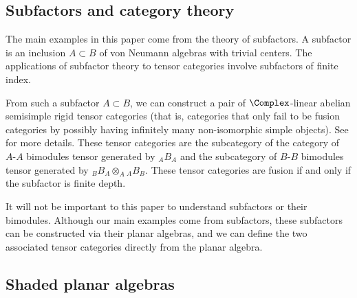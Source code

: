 
\subsection{Subfactors and category theory}

The main examples in this paper come from the theory of subfactors.  A subfactor is an inclusion $A \subset B$ of von Neumann algebras with trivial centers.  The applications of subfactor theory to tensor categories involve subfactors of finite index.

From such a subfactor $A \subset B$, we can construct a pair of $\Complex$-linear abelian semisimple rigid tensor categories (that is, categories that only fail to be fusion categories by possibly having infinitely many non-isomorphic simple objects).  See \cite{MR1424954} for more details. These tensor categories are  the subcategory of the category of $A\text{-}A$ bimodules tensor generated by ${}_A B_A$ and the subcategory of $B\text{-}B$ bimodules tensor generated by ${}_B B_A \otimes_A {}_A B_B$.  These tensor categories are fusion if and only if the subfactor is finite depth.

It will not be important to this paper to understand subfactors or their bimodules. Although our main examples come from subfactors, these subfactors can be constructed via their planar algebras, and we can define the two associated tensor categories directly from the planar algebra.

\subsection{Shaded planar algebras}

